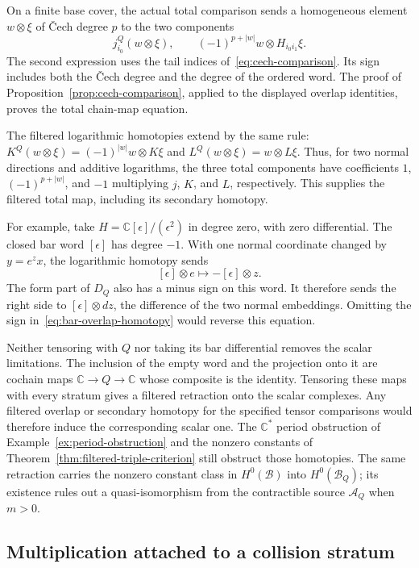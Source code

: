 On a finite base cover, the actual total comparison sends a homogeneous element
$w\otimes\xi$ of \v Cech degree $p$ to the two components
\[
j_{i_0}^Q(w\otimes\xi),\qquad
(-1)^{p+|w|}w\otimes H_{i_0i_1}\xi.
\]
The second expression uses the tail indices of~\eqref{eq:cech-comparison}.
Its sign includes both the \v Cech degree and the degree of the ordered word.
The proof of Proposition~\ref{prop:cech-comparison}, applied to the displayed overlap identities,
proves the total chain-map equation.

The filtered logarithmic homotopies extend by the same rule:
$K^Q(w\otimes\xi)=(-1)^{|w|}w\otimes K\xi$ and
$L^Q(w\otimes\xi)=w\otimes L\xi$.
Thus, for two normal directions and additive logarithms, the three total components have coefficients
$1$, $(-1)^{p+|w|}$, and $-1$ multiplying $j$, $K$, and $L$, respectively.
This supplies the filtered total map, including its secondary homotopy.

For example, take $H=\mathbb C[\epsilon]/(\epsilon^2)$ in degree zero, with zero differential.
The closed bar word $[\epsilon]$ has degree $-1$.
With one normal coordinate changed by $y=e^z x$, the logarithmic homotopy sends
\[
[\epsilon]\otimes e\longmapsto-[\epsilon]\otimes z.
\]
The form part of $D_Q$ also has a minus sign on this word.
It therefore sends the right side to $[\epsilon]\otimes dz$, the difference of the two normal embeddings.
Omitting the sign in~\eqref{eq:bar-overlap-homotopy} would reverse this equation.

Neither tensoring with $Q$ nor taking its bar differential removes the scalar limitations.
The inclusion of the empty word and the projection onto it are cochain maps
$\mathbb C\to Q\to\mathbb C$ whose composite is the identity.
Tensoring these maps with every stratum gives a filtered retraction onto the scalar complexes.
Any filtered overlap or secondary homotopy for the specified tensor comparisons would therefore induce the corresponding scalar one.
The $\mathbb C^*$ period obstruction of Example~\ref{ex:period-obstruction} and the nonzero constants of
Theorem~\ref{thm:filtered-triple-criterion} still obstruct those homotopies.
The same retraction carries the nonzero constant class in $H^0(\mathcal B)$ into $H^0(\mathcal B_Q)$;
its existence rules out a quasi-isomorphism from the contractible source $\mathcal A_Q$ when $m>0$.

\subsection{Multiplication attached to a collision stratum}
\label{subsec:state-changing-residues}

